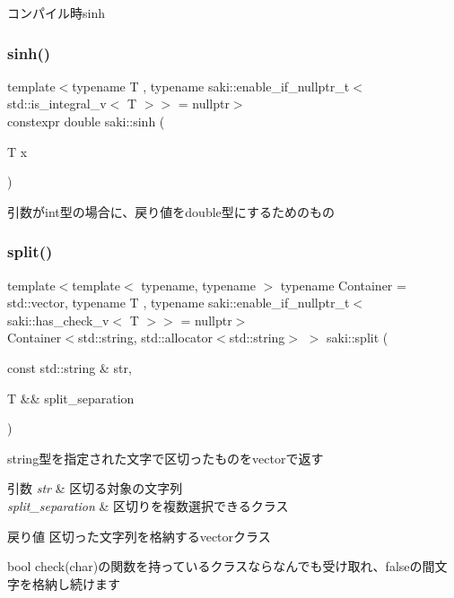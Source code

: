 コンパイル時sinh 

\mbox{\label{namespacesaki_a8199390b7650fdebe491aaeb4c3a44c3}} 
\subsubsection{\texorpdfstring{sinh()}{sinh()}\hspace{0.1cm}{\footnotesize\ttfamily [2/2]}}
{\footnotesize\ttfamily template$<$typename T , typename saki\+::enable\+\_\+if\+\_\+nullptr\+\_\+t$<$ std\+::is\+\_\+integral\+\_\+v$<$ T $>$$>$  = nullptr$>$ \\
constexpr double saki\+::sinh (\begin{DoxyParamCaption}\item[{T}]{x }\end{DoxyParamCaption})}



引数がint型の場合に、戻り値をdouble型にするためのもの 

\mbox{\label{namespacesaki_ad15185db28f6e77d65411ca83f64f5bb}} 
\subsubsection{\texorpdfstring{split()}{split()}\hspace{0.1cm}{\footnotesize\ttfamily [1/2]}}
{\footnotesize\ttfamily template$<$template$<$ typename, typename $>$ typename Container = std\+::vector, typename T , typename saki\+::enable\+\_\+if\+\_\+nullptr\+\_\+t$<$ saki\+::has\+\_\+check\+\_\+v$<$ T $>$$>$  = nullptr$>$ \\
Container$<$std\+::string, std\+::allocator$<$std\+::string$>$ $>$ saki\+::split (\begin{DoxyParamCaption}\item[{const std\+::string \&}]{str,  }\item[{T \&\&}]{split\+\_\+separation }\end{DoxyParamCaption})}



string型を指定された文字で区切ったものをvectorで返す 


\begin{DoxyParams}{引数}
{\em str} & 区切る対象の文字列 \\
\hline
{\em split\+\_\+separation} & 区切りを複数選択できるクラス \\
\hline
\end{DoxyParams}
\begin{DoxyReturn}{戻り値}
区切った文字列を格納するvectorクラス
\end{DoxyReturn}
bool check(char)の関数を持っているクラスならなんでも受け取れ、falseの間文字を格納し続けます \mbox{\label{namespacesaki_ac1464436ac78ade2ba14371e2efe1fd2}} 
